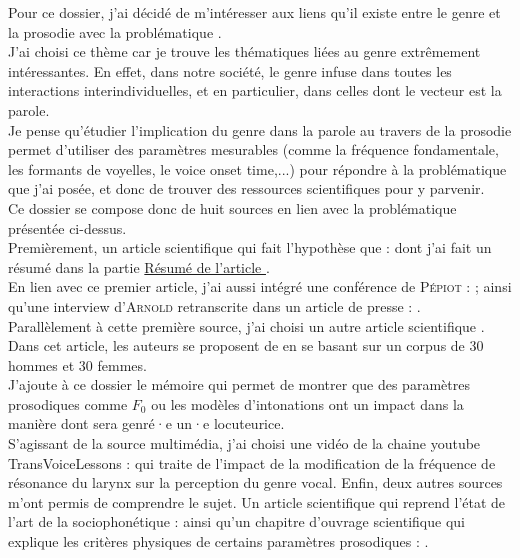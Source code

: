 Pour ce dossier, j'ai décidé de m'intéresser aux liens qu'il existe entre le genre et la prosodie avec la problématique . \\
J'ai choisi ce thème car je trouve les thématiques liées au genre extrêmement intéressantes.
En effet, dans notre société, le genre infuse dans toutes les interactions interindividuelles, et en particulier, dans celles dont le vecteur est la parole. \\
Je pense qu'étudier l'implication du genre dans la parole au travers de la prosodie permet d'utiliser des paramètres mesurables (comme la fréquence fondamentale, les formants de voyelles, le voice onset time,...) pour répondre à la problématique que j'ai posée, et donc de trouver des ressources scientifiques pour y parvenir.\\

Ce dossier se compose donc de huit sources en lien avec la problématique présentée ci-dessus.\\
Premièrement, un article scientifique qui fait l'hypothèse que  : \parencite{Pep20} dont j'ai fait un résumé dans la partie \hyperref[sec:resume]{Résumé de l'article \parencite{Pep20}}.\\
En lien avec ce premier article, j'ai aussi intégré une conférence de \textsc{Pépiot} : \parencite{Pep16}; ainsi qu'une interview d'\textsc{Arnold} retranscrite dans un article de presse : \parencite{Bro18}.\\
Parallèlement à cette première source, j'ai choisi un autre article scientifique \parencite{Boe75}. Dans cet article, les auteurs se proposent de  en se basant sur un corpus de 30 hommes et 30 femmes.\\
J'ajoute à ce dossier le mémoire \parencite{Gar22} qui permet de montrer que des paramètres prosodiques comme $F_0$ ou les modèles d'intonations ont un impact dans la manière dont sera genré·e un·e locuteurice.\\
S'agissant de la source multimédia, j'ai choisi une vidéo de la chaine youtube TransVoiceLessons : \parencite{video} qui traite de l'impact de la modification de la fréquence de résonance du larynx sur la perception du genre vocal.
Enfin, deux autres sources m'ont permis de comprendre le sujet. Un article scientifique qui reprend l'état de l'art de la sociophonétique : \parencite{Can15} ainsi qu'un chapitre d'ouvrage scientifique qui explique les critères physiques de certains paramètres prosodiques : \parencite{DiC13}.\\
